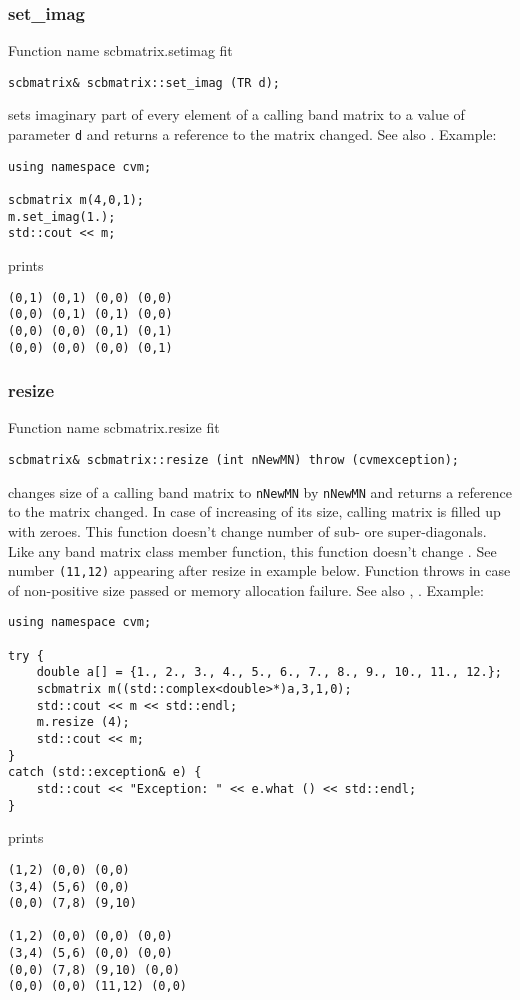 \subsubsection{set\_imag}
Function%
\pdfdest name {scbmatrix.setimag} fit
\begin{verbatim}
scbmatrix& scbmatrix::set_imag (TR d);
\end{verbatim}
sets imaginary part of every element of a calling band matrix to a value of
parameter \verb"d"
and returns a reference to the matrix changed.
See also .
Example:
\begin{Verbatim}
using namespace cvm;

scbmatrix m(4,0,1);
m.set_imag(1.);
std::cout << m;
\end{Verbatim}
prints
\begin{Verbatim}
(0,1) (0,1) (0,0) (0,0)
(0,0) (0,1) (0,1) (0,0)
(0,0) (0,0) (0,1) (0,1)
(0,0) (0,0) (0,0) (0,1)
\end{Verbatim}
\newpage



\subsubsection{resize}
Function%
\pdfdest name {scbmatrix.resize} fit
\begin{verbatim}
scbmatrix& scbmatrix::resize (int nNewMN) throw (cvmexception);
\end{verbatim}
changes  size of a calling band matrix to \verb"nNewMN" by \verb"nNewMN"
and returns a reference to
the matrix changed. In case of increasing of its size, calling matrix
is filled up with zeroes. This function doesn't change
 number of sub- ore super-diagonals. Like any band matrix 
class member function, this function doesn't change 
. 
See number \verb"(11,12)" appearing after
resize in example below.
Function throws  
in case of non-positive size passed or memory allocation failure.
See also ,
.
Example:
\begin{Verbatim}
using namespace cvm;

try {
    double a[] = {1., 2., 3., 4., 5., 6., 7., 8., 9., 10., 11., 12.};
    scbmatrix m((std::complex<double>*)a,3,1,0);
    std::cout << m << std::endl;
    m.resize (4);
    std::cout << m;
}
catch (std::exception& e) {
    std::cout << "Exception: " << e.what () << std::endl;
}
\end{Verbatim}
prints
\begin{Verbatim}
(1,2) (0,0) (0,0)
(3,4) (5,6) (0,0)
(0,0) (7,8) (9,10)

(1,2) (0,0) (0,0) (0,0)
(3,4) (5,6) (0,0) (0,0)
(0,0) (7,8) (9,10) (0,0)
(0,0) (0,0) (11,12) (0,0)
\end{Verbatim}
\newpage






